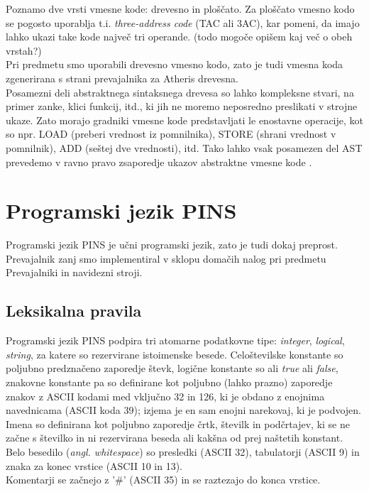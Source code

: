 \documentclass[a4paper, 12p]{book}
\begin{document}
Poznamo dve vrsti vmesne kode: drevesno in ploščato. Za ploščato vmesno kodo se pogosto uporablja t.i. \textit{three-address code} (TAC ali 3AC), kar pomeni, da imajo lahko ukazi take kode največ tri operande. (todo mogoče opišem kaj več o obeh vrstah?)\\
\indent Pri predmetu smo uporabili drevesno vmesno kodo, zato je tudi vmesna koda zgenerirana s strani prevajalnika za Atheris drevesna.\\
\indent Posamezni deli abstraktnega sintaksnega drevesa so lahko kompleksne stvari, na primer zanke, klici funkcij, itd., ki jih ne moremo neposredno preslikati v strojne ukaze. Zato morajo gradniki vmesne kode predstavljati le enostavne operacije, kot so npr. LOAD (preberi vrednost iz pomnilnika), STORE (shrani vrednost v pomnilnik), ADD (seštej dve vrednosti), itd. Tako lahko vsak posamezen del AST prevedemo v ravno pravo zsaporedje ukazov abstraktne vmesne kode \cite{modernCompiler}. \\ 

\chapter{Programski jezik PINS}

Programski jezik PINS je učni programski jezik, zato je tudi dokaj preprost. Prevajalnik zanj smo implementiral v sklopu domačih nalog pri predmetu Prevajalniki in navidezni stroji.

\section{Leksikalna pravila}

Programski jezik PINS podpira tri atomarne podatkovne tipe: \textit{integer}, \textit{logical}, \textit{string}, za katere so rezervirane istoimenske besede. Celoštevilske konstante so poljubno predznačeno zaporedje števk, logične konstante so ali \textit{true} ali \textit{false}, znakovne konstante pa so definirane kot poljubno (lahko prazno) zaporedje znakov z ASCII kodami med vključno 32 in 126, ki je obdano z enojnima navednicama (ASCII koda 39); izjema je en sam enojni narekovaj, ki je podvojen. \\
\indent Imena so definirana kot poljubno zaporedje črtk, številk in podčrtajev, ki se ne začne s številko in ni rezervirana beseda ali kakšna od prej naštetih konstant. \\
\indent Belo besedilo (\textit{angl. whitespace}) so presledki (ASCII 32), tabulatorji (ASCII 9) in znaka za konec vrstice (ASCII 10 in 13). \\
\indent Komentarji se začnejo z '\#' (ASCII 35) in se raztezajo do konca vrstice.
\end{document}
